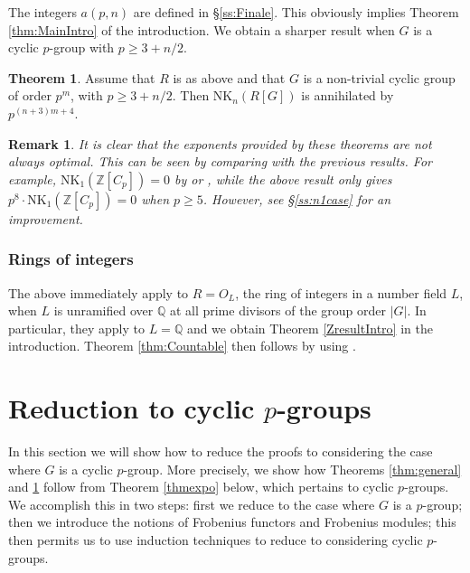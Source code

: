 \documentclass[reqno,11pt,letterpaper]{amsart}
\theoremstyle{plain}
\numberwithin{equation}{subsection}
\newtheorem{theorem}[equation]{Theorem}
\newtheorem{Remark}[equation]{Remark}
\theoremstyle{remark}
\theoremstyle{plain}
\theoremstyle{definition}\newtheorem*{notation}{Notation}
\newcommand{\bbQ}{{\mathbb Q}}
\newtheorem{theorem}{Theorem}
\newcommand{\RNK}{\mathrm{NK}}
\newcommand{\BZ}{\mathbb{Z}}
\begin{document}
The integers $a(p, n)$ are defined in \S \ref{ss:Finale}.
This obviously implies Theorem \ref{thm:MainIntro} of the introduction.
We obtain a  sharper result when $G$ is a cyclic $p$-group with $p\geq 3+n/2$.

\begin{theorem}\label{pcyclicIntro}
Assume that $R$ is as above and that $G$ is a non-trivial cyclic group of order $p^m$,  with $p\geq 3+n/2$.
Then $\RNK_{n}(R[G])$ is annihilated by
$
p^{(n+3)m+4 } .
$
\end{theorem}


 
 

\begin{Remark}
{\rm It is clear that the exponents provided by these theorems are not always optimal. This can be seen   by comparing with the previous results.
 For example, $\RNK_1(\BZ[C_p])=0$ by \cite[Cor. 1.1]{HLuck} or \cite{BassMurthy}, while   the above result only gives $p^8\cdot
\RNK_1(\BZ[C_p])=0$ when $p\geq 5$. However, see \S \ref{ss:n1case} for an improvement.}
\end{Remark}

 
 \subsubsection{Rings of integers}
 
The above  immediately apply to $R=O_L$, the ring of integers in a number field $L$,
when $L$ is unramified over $\mathbb{Q}$  at all prime divisors of the group order 
$|G|$.  In particular, they apply to $L=\bbQ$ and we obtain Theorem \ref{ZresultIntro} in the introduction. Theorem \ref{thm:Countable} 
then follows by using \cite[Theorem C]{LPW}.

 
  
 
 
\section{Reduction to cyclic $p$-groups}\label{s:reduction}

In this section we will show how to reduce the proofs to considering the case where $G$ is a cyclic $p$-group. 
More precisely, we show how Theorems   \ref{thm:general}  and \ref{pcyclicIntro}  follow from  Theorem \ref{thmexpo} below,  which pertains to cyclic $p$-groups. We accomplish this in two steps: first we reduce to the case where $G$ is a $p$-group; then we introduce the notions of Frobenius functors and Frobenius modules; this then permits us to use induction techniques to reduce to considering cyclic $p$-groups. 
\end{document}
